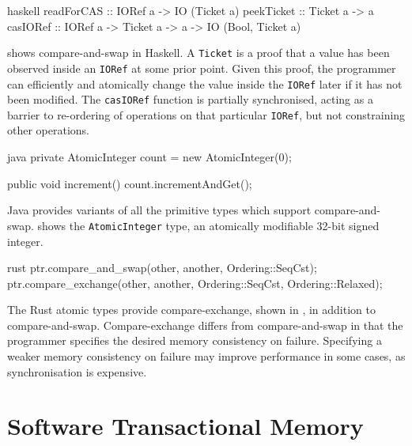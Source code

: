 \begin{listing}
\centering
\begin{cminted}{haskell}
readForCAS :: IORef a -> IO (Ticket a)
peekTicket :: Ticket a -> a
casIORef   :: IORef a -> Ticket a -> a -> IO (Bool, Ticket a)
\end{cminted}
\caption{Compare-and-swap in Haskell.}\label{lst:cas_haskell}
\end{listing}

 shows compare-and-swap in Haskell.  A
\verb|Ticket| is a proof that a value has been observed inside an
\verb|IORef| at some prior point.  Given this proof, the programmer
can efficiently and atomically change the value inside the
\verb|IORef| later if it has not been modified.  The \verb|casIORef|
function is partially synchronised, acting as a barrier to re-ordering
of operations on that particular \verb|IORef|, but not constraining
other operations.

\begin{listing}
\centering
\begin{cminted}{java}
private AtomicInteger count = new AtomicInteger(0);

public void increment() {
  count.incrementAndGet();
}
\end{cminted}
\caption{Compare-and-swap in Java.}\label{lst:cas_java}
\end{listing}

Java provides variants of all the primitive types which support
compare-and-swap.   shows the \verb|AtomicInteger|
type, an atomically modifiable 32-bit signed integer.

\begin{listing}
\centering
\begin{cminted}{rust}
ptr.compare_and_swap(other, another, Ordering::SeqCst);
ptr.compare_exchange(other, another, Ordering::SeqCst, Ordering::Relaxed);
\end{cminted}
\caption{Compare-and-swap in Rust.}\label{lst:cas_rust}
\end{listing}

The Rust atomic types provide compare-exchange, shown in
, in addition to compare-and-swap.
Compare-exchange differs from compare-and-swap in that the programmer
specifies the desired memory consistency on failure.  Specifying a
weaker memory consistency on failure may improve performance in some
cases, as synchronisation is expensive.

\section{Software Transactional Memory}
\label{sec:concurrent_haskell-stm}

